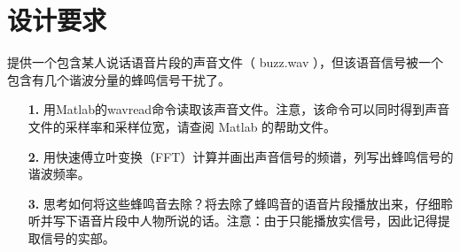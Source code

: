 \section{设计要求}
\indent 提供一个包含某人说话语音片段的声音文件（ buzz.wav ），但该语音信号被一个包含有几个谐波分量的蜂鸣信号干扰了。
\begin{itemize}
    \item [\textbf{1.}] 用Matlab的wavread命令读取该声音文件。注意，该命令可以同时得到声音文件的采样率和采样位宽，请查阅 Matlab 的帮助文件。
    \item [\textbf{2.}] 用快速傅立叶变换（FFT）计算并画出声音信号的频谱，列写出蜂鸣信号的谐波频率。
    \item [\textbf{3.}] 思考如何将这些蜂鸣音去除？将去除了蜂鸣音的语音片段播放出来，仔细聆听并写下语音片段中人物所说的话。注意：由于只能播放实信号，因此记得提取信号的实部。
\end{itemize} 